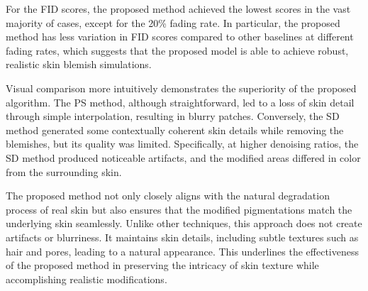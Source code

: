 \begin{spacing}{1.5}
\begin{table}[t!]
    \caption{FID scores of different blemish fading rates. Lower scores are better.}
    \label{tbl:fid}
\end{table}

For the FID scores, the proposed method achieved the lowest scores in the vast majority of cases, except for the 20\% fading rate. In particular, the proposed method has less variation in FID scores compared to other baselines at different fading rates, which suggests that the proposed model is able to achieve robust, realistic skin blemish simulations.

Visual comparison more intuitively demonstrates the superiority of the proposed algorithm. The PS method, although straightforward, led to a loss of skin detail through simple interpolation, resulting in blurry patches. Conversely, the SD method generated some contextually coherent skin details while removing the blemishes, but its quality was limited. Specifically, at higher denoising ratios, the SD method produced noticeable artifacts, and the modified areas differed in color from the surrounding skin.

The proposed method not only closely aligns with the natural degradation process of real skin but also ensures that the modified pigmentations match the underlying skin seamlessly. Unlike other techniques, this approach does not create artifacts or blurriness. It maintains skin details, including subtle textures such as hair and pores, leading to a natural appearance. This underlines the effectiveness of the proposed method in preserving the intricacy of skin texture while accomplishing realistic modifications.


\end{spacing}
